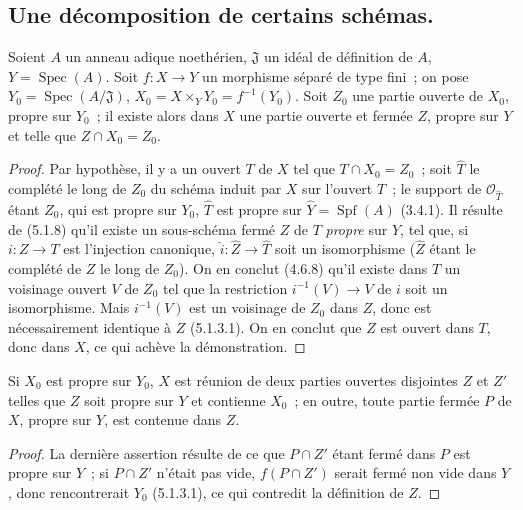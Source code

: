 \subsection{Une décomposition de certains schémas.}
\label{subsection:III.5.5-fr}

\begin{proposition}[5.5.1]
\label{III.5.5.1-fr}
Soient $A$ un anneau adique noethérien, $\mathfrak J$ un idéal de définition
de $A$, $Y=\operatorname{Spec}(A)$. Soit $f:X\to Y$ un morphisme séparé de
type fini~; on pose $Y_0=\operatorname{Spec}(A/\mathfrak J)$,
$X_0=X\times_Y Y_0=f^{-1}(Y_0)$. Soit $Z_0$ une partie ouverte de $X_0$,
propre sur $Y_0$~; il existe alors dans $X$ une partie ouverte et fermée $Z$,
propre sur $Y$ et telle que $Z\cap X_0=Z_0$.
\end{proposition}

\begin{proof}
Par hypothèse, il y a un ouvert $T$ de $X$ tel que $T\cap X_0=Z_0$~; soit
$\widehat T$ le complété le long de $Z_0$ du schéma induit par $X$ sur
l'ouvert $T$~; le support de $\mathcal O_{\widehat T}$ étant $Z_0$, qui est
propre sur $Y_0$, $\widehat T$ est propre sur
$\widehat Y=\operatorname{Spf}(A)$ (3.4.1). Il résulte de (5.1.8) qu'il existe
un sous-schéma fermé $Z$ de $T$ \emph{propre} sur $Y$, tel que, si $i:Z\to T$ est
l'injection canonique, $\widehat i:\widehat Z\to\widehat T$ soit un
isomorphisme ($\widehat Z$ étant le complété de $Z$ le long de $Z_0$). On en
conclut (4.6.8) qu'il existe dans $T$ un voisinage ouvert $V$ de $Z_0$ tel que
la restriction $i^{-1}(V)\to V$ de $i$ soit un isomorphisme. Mais
$i^{-1}(V)$ est un voisinage de $Z_0$ dans $Z$, donc est nécessairement
identique à $Z$ (5.1.3.1). On en conclut que $Z$ est ouvert dans $T$, donc
dans $X$, ce qui achève la démonstration.
\end{proof}

\begin{corollary}[5.5.2]
\label{III.5.5.2-fr}
Si $X_0$ est propre sur $Y_0$, $X$ est réunion de deux parties ouvertes
disjointes $Z$ et $Z'$ telles que $Z$ soit propre sur $Y$ et contienne $X_0$~;
en outre, toute partie fermée $P$ de $X$, propre sur $Y$, est contenue dans
$Z$.
\end{corollary}

\begin{proof}
La dernière assertion résulte de ce que $P\cap Z'$ étant fermé dans $P$ est
propre sur $Y$~; si $P\cap Z'$ n'était pas vide, $f(P\cap Z')$ serait fermé
non vide dans $Y$, donc rencontrerait $Y_0$ (5.1.3.1), ce qui contredit la
définition de $Z$.
\end{proof}


